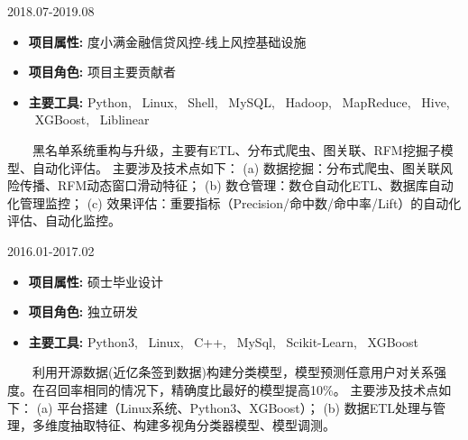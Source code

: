 \documentclass{resume}
\begin{document}
\medskip










                             {2018.07-2019.08}

\begin{itemize} [parsep=0.5ex]

\item   \textbf{  项目属性:  }  {  度小满金融信贷风控-线上风控基础设施  }
\item   \textbf{  项目角色:  }  {  项目主要贡献者  }
\item   \textbf{  主要工具:  }  {  Python, \ Linux, \ Shell, \ MySQL, \ Hadoop, \ MapReduce, \ Hive, \ XGBoost, \ Liblinear  }

\end{itemize}


{  \ \ \ \ 黑名单系统重构与升级，主要有ETL、分布式爬虫、图关联、RFM挖掘子模型、自动化评估。
主要涉及技术点如下：
(a) 数据挖掘：分布式爬虫、图关联风险传播、RFM动态窗口滑动特征；
(b) 数仓管理：数仓自动化ETL、数据库自动化管理监控；
(c) 效果评估：重要指标（Precision/命中数/命中率/Lift）的自动化评估、自动化监控。}

\medskip










                   {2016.01-2017.02}

\begin{itemize} [parsep=0.3ex]

\item   \textbf{ 项目属性: }   {硕士毕业设计}
\item   \textbf{ 项目角色: }   {独立研发}    
\item   \textbf{ 主要工具: }  { Python3,  \ Linux,  \ C++,  \ MySql,  \ Scikit-Learn,  \ XGBoost }

\end{itemize}


{ \ \ \ \ 利用开源数据(近亿条签到数据)构建分类模型，模型预测任意用户对关系强度。在召回率相同的情况下，精确度比最好的模型提高10\%。
主要涉及技术点如下：
(a) 平台搭建（Linux系统、Python3、XGBoost）；
(b) 数据ETL处理与管理，多维度抽取特征、构建多视角分类器模型、模型调测。}

\medskip
\end{document}
